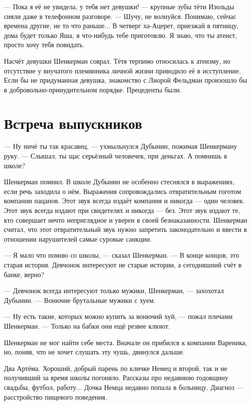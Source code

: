 \documentclass[a4paper,10pt,fleqn]{book}\usepackage{polyglossia}\setdefaultlanguage{english}\setotherlanguage{russian}\defaultfontfeatures{Ligatures=TeX,Mapping=tex-text} \usepackage{xcolor}\definecolor{lightgray}{HTML}{bbbbbb}\color{lightgray}\newcommand{\ml}[3]{\textcolor{black}{#3}}
\newcommand{\textspace}{\vspace{1em}{\centering\Large\bfseries<...>\par}\vspace{1em}}
\begin{document}
--- Пока я её не увидела, у тебя нет девушки! --- крупные зубы тёти Изольды сияли даже в телефонном разговоре.
--- Шучу, не волнуйся.
Понимаю, сейчас времена другие, не то что раньше...
В четверг ха-Ацерет, приезжай в пятницу, дома будет только Яша, я что-нибудь тебе приготовлю.
Я знаю, что ты атеист, просто хочу тебя повидать.

Насчёт девушки Шенкерман соврал.
Тётя терпимо относилась к атеизму, но отсутствие у внучатого племянника личной жизни приводило её в исступление.
Если бы не придуманная девушка, знакомство с Лиорой Фельдман произошло бы в добровольно-принудительном порядке.
Прецеденты были.

\section{Встреча выпускников}

--- Ну ничё ты так красавец, --- ухмыльнулся Дубынин, пожимая Шенкерману руку.
--- Слышал, ты щас серьёзный человечек, при деньгах.
А помнишь в школе?

Шенкерман помнил.
В школе Дубынин не особенно стеснялся в выражениях, если речь заходила о нём.
Выражения сопровождались отвратительным гоготом компании пацанов.
Этот звук всегда издаёт компания и никогда --- один человек.
Этот звук всегда издают при свидетелях и никогда --- без.
Этот звук издают те, кто совершает нечто неприглядное и уверен в своей безнаказанности.
Шенкерман считал, что этот отвратительный звук нужно запретить законодательно и ввести в отношении нарушителей самые суровые санкции.

--- Я мало что помню со школы, --- сказал Шенкерман.
--- В конце концов, это старая история.
Девчонок интересуют не старые истории, а сегодняшний счёт в банке, верно?

--- Девчонок всегда интересуют только мужики, Шенкерман, --- захохотал Дубынин.
--- Вонючие брутальные мужики с хуем.

--- Ну есть такие, которых можно купить за вонючий хуй, --- пожал плечами Шенкерман.
--- Только на бабки они ещё резвее клюют.

\textspace

Шенкерман не мог найти себе места.
Вначале он прибился к компании Вареника, но, поняв, что не хочет слушать эту чушь, двинулся дальше.

Два Артёма.
Хороший, добрый парень по кличке Немец и второй, так и не получивший за время школы погоняло.
Рассказы про недавнюю годовщину свадьбы, футбол, работу...
Дочка Немца недавно попала в больницу.
Диагноз --- расстройство пищевого поведения.
\end{document}
